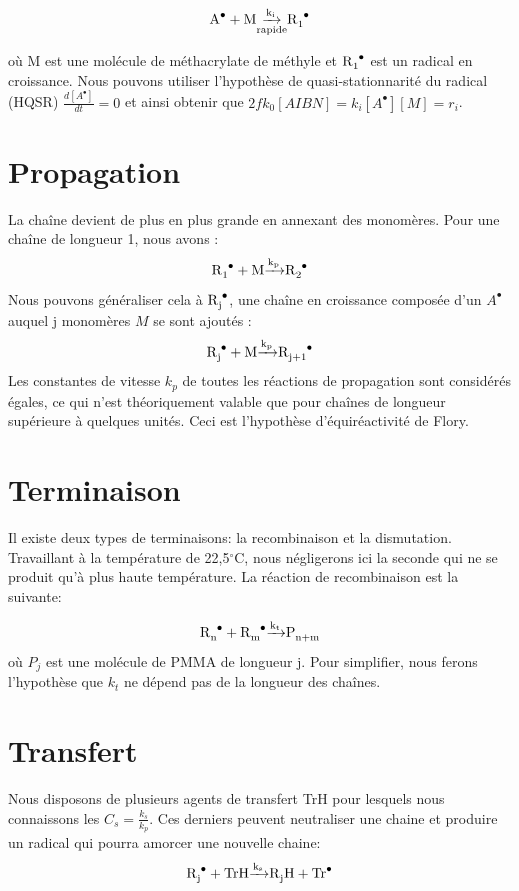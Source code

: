 \documentclass[a4paper,oneside,12pt]{article}
\begin{document}
\begin{equation}
\ce{A^{\bullet} + M \underset{rapide}{\xrightarrow{k_i}} R1^{\bullet}}
\label{2}
\end{equation}

où M est une molécule de méthacrylate de méthyle et $\ce{R_1^{\bullet}}$ est un radical en croissance. Nous pouvons utiliser l'hypothèse de quasi-stationnarité du radical (HQSR) $\frac{d[A^{\bullet}]}{dt}=0$ et ainsi obtenir que $2fk_{0}[AIBN]=k_{i}[A^{\bullet}][M]=r_i$.

\section{Propagation}
La chaîne devient de plus en plus grande en annexant des monomères. Pour une chaîne de longueur 1, nous avons :
\begin{equation}
\ce{R1^{\bullet} + M \xrightarrow{k_p} R2^{\bullet}}
\end{equation}
Nous pouvons généraliser cela à $\ce{R_j^{\bullet}}$, une chaîne en croissance composée d'un $A^{\bullet}$ auquel j monomères $M$ se sont ajoutés :
\begin{equation}
\ce{R_j^{\bullet} + M \xrightarrow{k_p} R_{j+1}^{\bullet}}
\end{equation}
Les constantes de vitesse $k_{p}$ de toutes les réactions de propagation sont considérés égales, ce qui n'est théoriquement valable que pour chaînes de longueur supérieure à quelques unités. Ceci est l'hypothèse d'équiréactivité de Flory.

\section{Terminaison}
Il existe deux types de terminaisons: la recombinaison et la dismutation. Travaillant à la température de 22,5$^{\circ}$C, nous négligerons ici la seconde qui ne se produit qu'à plus haute température. La réaction de recombinaison est la suivante:

\begin{equation}
\ce{R_{n}^{\bullet} + R_{m}^{\bullet} \xrightarrow{k_t} P_{n+m}}
\end{equation}
où $P_{j}$ est une molécule de PMMA de longueur j. Pour simplifier, nous ferons l'hypothèse que $k_{t}$ ne dépend pas de la longueur des chaînes.

\section{Transfert}
Nous disposons de plusieurs agents de transfert TrH pour lesquels nous connaissons les $C_{s}=\frac{k_{s}}{k_{p}}$. Ces derniers peuvent neutraliser une chaine et produire un radical qui pourra amorcer une nouvelle chaine:
\begin{equation}
\ce{R_{j}^{\bullet} + TrH \xrightarrow{k_s} R_{j}H + Tr^{\bullet}}
\label{6}
\end{equation}
\end{document}
